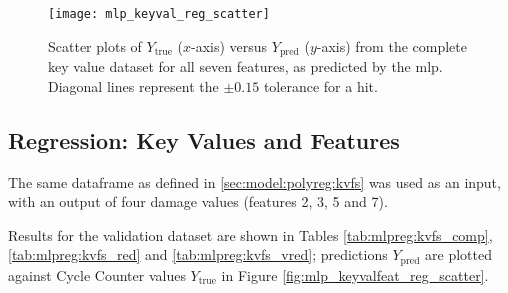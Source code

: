 \begin{figure}
    \centering
    \texttt{[image: mlp\_keyval\_reg\_scatter]}
    \caption{\label{fig:mlp_keyval_reg_scatter} Scatter plots of \(Y_\text{true}\) (\(x\)-axis) versus \(Y_\text{pred}\) (\(y\)-axis) from the complete key value dataset for all seven features, as predicted by the \ac{mlp}. Diagonal lines represent the \(\pm0.15\) tolerance for a hit.}
\end{figure}

\subsection{Regression: Key Values and Features} \label{sec:model:mlp_kvfs}
The same dataframe as defined in \ref{sec:model:polyreg:kvfs} was used as an input, with an output of four damage values (features 2, 3, 5 and 7).

Results for the validation dataset are shown in Tables \ref{tab:mlpreg:kvfs_comp}, \ref{tab:mlpreg:kvfs_red} and \ref{tab:mlpreg:kvfs_vred}; predictions \(Y_{\text{pred}}\) are plotted against Cycle Counter values \(Y_{\text{true}}\) in Figure \ref{fig:mlp_keyvalfeat_reg_scatter}.

